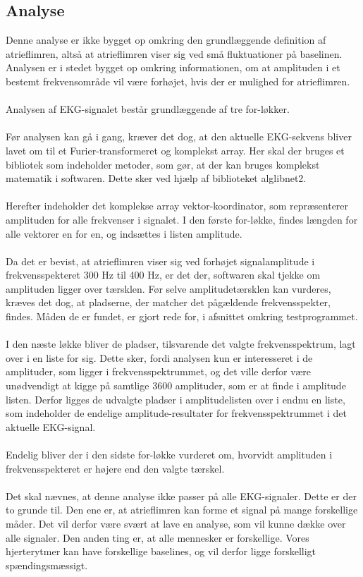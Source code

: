 \subsection{Analyse}
Denne analyse er ikke bygget op omkring den grundlæggende definition af atrieflimren, altså at atrieflimren viser sig ved små fluktuationer på baselinen. Analysen er i stedet bygget op omkring informationen, om at amplituden i et bestemt frekvensområde vil være forhøjet, hvis der er mulighed for atrieflimren. \\ \\
Analysen af EKG-signalet består grundlæggende af tre for-løkker. \\ \\
Før analysen kan gå i gang, kræver det dog, at den aktuelle EKG-sekvens bliver lavet om til et Furier-transformeret og komplekst array. Her skal der bruges et bibliotek som indeholder metoder, som gør, at der kan bruges komplekst matematik i softwaren. Dette sker ved hjælp af biblioteket alglibnet2. \\ \\
Herefter indeholder det komplekse array vektor-koordinator, som repræsenterer amplituden for alle frekvenser i signalet. I den første for-løkke, findes længden for alle vektorer en for en, og indsættes i listen amplitude. \\ \\
Da det er bevist, at atrieflimren viser sig ved forhøjet signalamplitude i frekvensspekteret 300 Hz til 400 Hz, er det der, softwaren skal tjekke om amplituden ligger over tærsklen. Før selve amplitudetærsklen kan vurderes, kræves det dog, at pladserne, der matcher det pågældende frekvensspekter, findes. Måden de er fundet, er gjort rede for, i afsnittet omkring testprogrammet. \\ \\
I den næste løkke bliver de pladser, tilsvarende det valgte frekvensspektrum, lagt over i en liste for sig. Dette sker, fordi analysen kun er interesseret i de amplituder, som ligger i frekvensspektrummet, og det ville derfor være unødvendigt at kigge på samtlige 3600 amplituder, som er at finde i amplitude listen. Derfor ligges de udvalgte pladser i amplitudelisten over i endnu en liste, som indeholder de endelige amplitude-resultater for frekvensspektrummet i det aktuelle EKG-signal. \\ \\
Endelig bliver der i den sidste for-løkke vurderet om, hvorvidt amplituden i frekvensspekteret er højere end den valgte tærskel. \\ \\
Det skal nævnes, at denne analyse ikke passer på alle EKG-signaler. Dette er der to grunde til. Den ene er, at atrieflimren kan forme et signal på mange forskellige måder. Det vil derfor være svært at lave en analyse, som vil kunne dække over alle signaler. Den anden ting er, at alle mennesker er forskellige. Vores hjerterytmer kan have forskellige baselines, og vil derfor ligge forskelligt spændingsmæssigt. 

